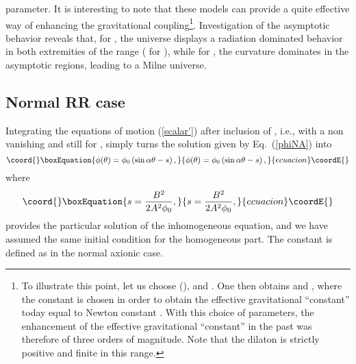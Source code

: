 \documentclass[a4paper,aps,twocolumn,prd,showpacs,nofootinbib]{revtex4}
\providecommand{\GN}{G_{_{\rm N}}}
\begin{document}
parameter. It is interesting to note that these models can provide a
quite effective way of enhancing the gravitational
coupling\footnote{To illustrate this point, let us choose \coordHE{}
(\coordHE{}), \coordHE{} and \coordHE{}. One then obtains \coordHE{} and
\coordHE{}, where the constant \coordHE{} is chosen
\coordHE{} in order to obtain the effective gravitational
``constant'' today equal to Newton constant \myHighlight{$\GN$}\coordHE{}.  With this choice
of parameters, the enhancement of the effective gravitational
``constant'' in the past was therefore of three orders of magnitude.
Note that the dilaton is strictly positive and finite in this
range.}. Investigation of the asymptotic behavior reveals that, for \coordHE{}, the universe displays a radiation dominated behavior in both
extremities of the range (\coordHE{} for \coordHE{}), while for \coordHE{}, the curvature dominates in the
asymptotic regions, leading to a Milne universe.

\subsection{Normal RR case}

Integrating the equations of motion (\ref{scalar'}) after inclusion of
\myHighlight{$\xi$}\coordHE{}, i.e., with a non vanishing \coordHE{} and still for \coordHE{},
simply turns the solution given by Eq.~(\ref{phiNA}) into
\begin{equation}\coord{}\boxEquation{
\phi(\theta) = \phi_0\left(\sin\alpha\theta - s\right),
}{
\phi(\theta) = \phi_0\left(\sin\alpha\theta - s\right),
}{ecuacion}\coordE{}\end{equation}
where
\begin{equation}\coord{}\boxEquation{
s = \frac{B^2}{2A^2\phi_0},
}{
s = \frac{B^2}{2A^2\phi_0},
}{ecuacion}\coordE{}\end{equation}
provides the particular solution of the inhomogeneous equation, and we
have assumed the same initial condition for the homogeneous part. The
constant \myHighlight{$\alpha$}\coordHE{} is defined as in the normal axionic case.
\end{document}

